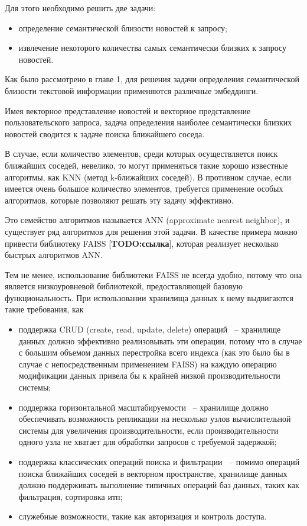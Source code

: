 Для этого необходимо решить две задачи:
\begin{itemize}
    \item определение семантической близости новостей к запросу;
    \item извлечение некоторого количества самых семантически близких к запросу новостей.
\end{itemize}

Как было рассмотрено в главе 1, для решения задачи определения семантической близости текстовой информации применяются различные эмбеддинги.

Имея векторное представление новостей и векторное представление пользовательского запроса, задача определения наиболее семантически близких новостей сводится к задаче поиска ближайшего соседа.

В случае, если количество элементов, среди которых осуществляется поиск ближайших соседей, невелико, то могут применяться такие хорошо известные алгоритмы, как KNN (метод k-ближайших соседей). В противном случае, если имеется очень большое количество элементов, требуется применение особых алгоритмов, которые позволяют решать эту задачу эффективно.

Это семейство алгоритмов называется ANN (approximate nearest neighbor), и существует ряд алгоритмов для решения этой задачи. В качестве примера можно привести библиотеку FAISS [\textbf{TODO:ссылка}], которая реализует несколько быстрых алгоритмов ANN.

Тем не менее, использование библиотеки FAISS не всегда удобно, потому что она является низкоуровневой библиотекой, предоставляющей базовую функциональность. При использовании хранилища данных к нему выдвигаются такие требования, как
\begin{itemize}
    \item поддержка CRUD (create, read, update, delete) операций ~-- хранилище данных должно эффективно реализовывать эти операции, потому что в случае с большим объемом данных перестройка всего индекса (как это было бы в случае с непосредственным применением FAISS) на каждую операцию модификации данных привела бы к крайней низкой производительности системы;
    \item поддержка горизонтальной масштабируемости ~-- хранилище должно обеспечивать возможность репликации на несколько узлов вычислительной системы для увеличения производительности, если производительности одного узла не хватает для обработки запросов с требуемой задержкой;
    \item поддержка классических операций поиска и фильтрации ~-- помимо операций поиска ближайших соседей в векторном пространстве, хранилище данных должно поддерживать выполнение типичных операций баз данных, таких как фильтрация, сортировка итп;
    \item служебные возможности, такие как авторизация и контроль доступа.
\end{itemize}

